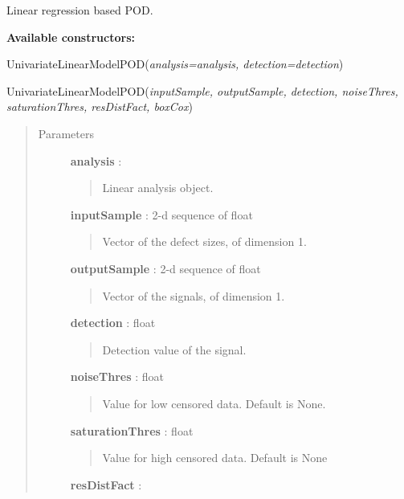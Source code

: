 \documentclass[letterpaper,10pt,english]{sphinxmanual}
\begin{document}
\begin{fulllineitems}
\label{_generated/otpod.UnivariateLinearModelPOD:otpod.UnivariateLinearModelPOD}
Linear regression based POD.

\textbf{Available constructors:}

UnivariateLinearModelPOD(\emph{analysis=analysis, detection=detection})

UnivariateLinearModelPOD(\emph{inputSample, outputSample, detection, noiseThres,
saturationThres, resDistFact, boxCox})
\begin{quote}\begin{description}
\item[{Parameters}] \leavevmode
\textbf{analysis} : {\hyperref[_generated/otpod.UnivariateLinearModelAnalysis:otpod.UnivariateLinearModelAnalysis]{\emph{}}}
\begin{quote}

Linear analysis object.
\end{quote}

\textbf{inputSample} : 2-d sequence of float
\begin{quote}

Vector of the defect sizes, of dimension 1.
\end{quote}

\textbf{outputSample} : 2-d sequence of float
\begin{quote}

Vector of the signals, of dimension 1.
\end{quote}

\textbf{detection} : float
\begin{quote}

Detection value of the signal.
\end{quote}

\textbf{noiseThres} : float
\begin{quote}

Value for low censored data. Default is None.
\end{quote}

\textbf{saturationThres} : float
\begin{quote}

Value for high censored data. Default is None
\end{quote}

\textbf{resDistFact} : \href{http://doc.openturns.org/openturns-latest/sphinx/user\_manual/\_generated/openturns.DistributionFactory.html\#openturns.DistributionFactory}{}
\begin{quote}


\end{quote}
\end{description}
\end{quote}
\end{fulllineitems}
\end{document}
